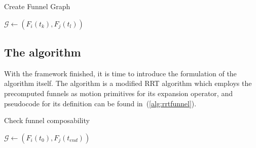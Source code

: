\begin{algorithm}
  \caption{Create Funnel Graph}
  \label{alg:create-funnel-graph}
  \DontPrintSemicolon \SetAlgoNoLine

   

   {  {
       {  {
           { \(\mathcal{G}
            \leftarrow{} \left( F_{i}(t_{k}), F_{j}(t_{l}) \right)\) }
        }
      }
    }
  }

\end{algorithm}

\subsection{The \rrtfunnel{} algorithm}

With the framework finished, it is time to introduce the formulation of the
\rrtfunnel{} algorithm itself. The \rrtfunnel{} algorithm is a modified \ac{RRT}
algorithm which employs the precomputed funnels as motion primitives for its
expansion operator, and pseudocode for its definition can be found
in~(\ref{alg:rrtfunnel}).

\begin{algorithm}
  \caption{Check funnel composability}
  \label{alg:create-funnel-graph}
  \DontPrintSemicolon \SetAlgoNoLine

   

   {  {
       { \(\mathcal{G} \leftarrow{}
        \left( F_{i}(t_{0}), F_{j}(t_{end}) \right)\) } \; }\; }\;

\end{algorithm}


